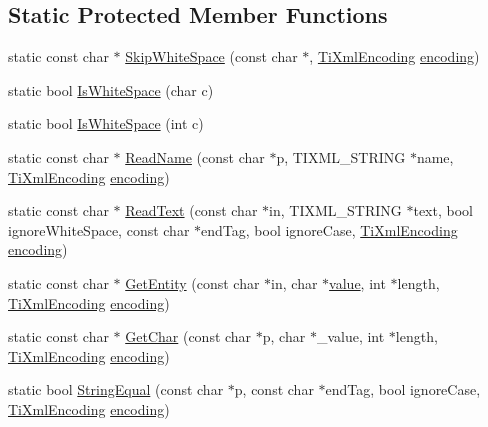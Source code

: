 \subsection*{Static Protected Member Functions}
\begin{DoxyCompactItemize}
\item 
static const char $\ast$ \hyperlink{classTiXmlBase_ac0c3d66d8a9e6996a1fa016275e16875}{SkipWhiteSpace} (const char $\ast$, \hyperlink{tinyxml_8h_a88d51847a13ee0f4b4d320d03d2c4d96}{TiXmlEncoding} \hyperlink{classTiXmlDeclaration_a24b8645d7696ec169bbb3fb7d30860cf}{encoding})
\item 
static bool \hyperlink{classTiXmlBase_af56296d561c0bab4bc8e198cdcf5c48e}{IsWhiteSpace} (char c)
\item 
static bool \hyperlink{classTiXmlBase_a3de391ea9f4c4a8aa10d04480b048795}{IsWhiteSpace} (int c)
\item 
static const char $\ast$ \hyperlink{classTiXmlBase_a1c21a6ab5f7b503acd91f35f183734b3}{ReadName} (const char $\ast$p, TIXML\_\-STRING $\ast$name, \hyperlink{tinyxml_8h_a88d51847a13ee0f4b4d320d03d2c4d96}{TiXmlEncoding} \hyperlink{classTiXmlDeclaration_a24b8645d7696ec169bbb3fb7d30860cf}{encoding})
\item 
static const char $\ast$ \hyperlink{classTiXmlBase_aa646c74921aa33156968b802bbf5566e}{ReadText} (const char $\ast$in, TIXML\_\-STRING $\ast$text, bool ignoreWhiteSpace, const char $\ast$endTag, bool ignoreCase, \hyperlink{tinyxml_8h_a88d51847a13ee0f4b4d320d03d2c4d96}{TiXmlEncoding} \hyperlink{classTiXmlDeclaration_a24b8645d7696ec169bbb3fb7d30860cf}{encoding})
\item 
static const char $\ast$ \hyperlink{classTiXmlBase_ac5c08bf3deffcda0bf8ce2958372b584}{GetEntity} (const char $\ast$in, char $\ast$\hyperlink{classTiXmlNode_aead528b3cedc33c16a6c539872c7cc8b}{value}, int $\ast$length, \hyperlink{tinyxml_8h_a88d51847a13ee0f4b4d320d03d2c4d96}{TiXmlEncoding} \hyperlink{classTiXmlDeclaration_a24b8645d7696ec169bbb3fb7d30860cf}{encoding})
\item 
static const char $\ast$ \hyperlink{classTiXmlBase_a5b0fde72d6f662ae1fd6303195d2159b}{GetChar} (const char $\ast$p, char $\ast$\_\-value, int $\ast$length, \hyperlink{tinyxml_8h_a88d51847a13ee0f4b4d320d03d2c4d96}{TiXmlEncoding} \hyperlink{classTiXmlDeclaration_a24b8645d7696ec169bbb3fb7d30860cf}{encoding})
\item 
static bool \hyperlink{classTiXmlBase_a51631e6986179558b9e5850723ed165a}{StringEqual} (const char $\ast$p, const char $\ast$endTag, bool ignoreCase, \hyperlink{tinyxml_8h_a88d51847a13ee0f4b4d320d03d2c4d96}{TiXmlEncoding} \hyperlink{classTiXmlDeclaration_a24b8645d7696ec169bbb3fb7d30860cf}{encoding})

\end{DoxyCompactItemize}
